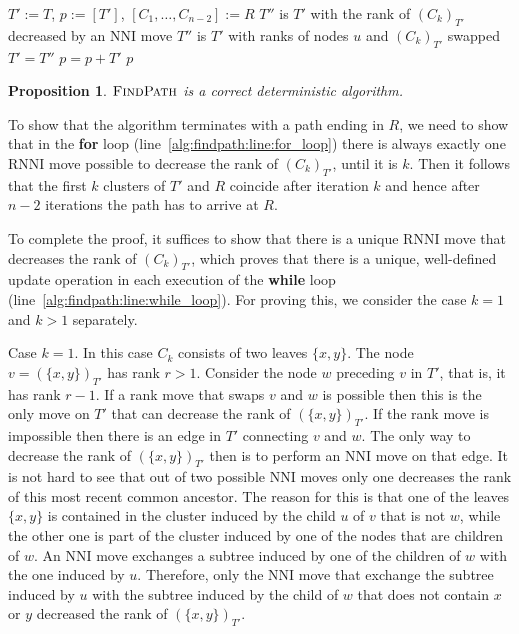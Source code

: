 \documentclass[11pt]{amsart}
\newtheorem{proposition}{Proposition}
\newcommand{\rnni}{\mathrm{RNNI}}
\newcommand{\findpath}{\textsc{FindPath}}
\newcommand{\rank}{\mathrm{rank}}
\newcommand{\nni}{\mathrm{NNI}}
\begin{document}
\begin{algorithm}[H]
\caption{$\findpath$($T,R$)}
\begin{algorithmic}[1]
\STATE $T' := T$, $p := [T']$, $[C_1, \ldots, C_{n-2}] := R$
\label{alg:findpath:line:for_loop}
	\WHILE {$\rank((C_k)_{T'})>k$}
	\label{alg:findpath:line:while_loop}
			\STATE $T''$ is $T'$ with the rank of $(C_k)_{T'}$ decreased by an $\nni$ move
		\ELSE
			\STATE $T''$ is $T'$ with ranks of nodes $u$ and $(C_k)_{T'}$ swapped
		\ENDIF
		\STATE $T' = T''$
		\STATE $p = p+T'$
	\ENDWHILE
\ENDFOR
\RETURN $p$
\end{algorithmic}
\end{algorithm}

\begin{proposition}
$\findpath$ is a correct deterministic algorithm.
\end{proposition}

\proof
To show that the algorithm terminates with a path ending in $R$, we need to show that in the \textbf{for} loop (line~\ref{alg:findpath:line:for_loop}) there is always exactly one $\rnni$ move possible to decrease the rank of $(C_k)_{T'}$, until it is $k$.
Then it follows that the first $k$ clusters of $T'$ and $R$ coincide after iteration $k$ and hence after $n-2$ iterations the path has to arrive at $R$.

To complete the proof, it suffices to show that there is a unique $\rnni$ move that decreases the rank of $(C_k)_{T'}$, which proves that there is a unique, well-defined update operation in each execution of the \textbf{while} loop (line~\ref{alg:findpath:line:while_loop}).
For proving this, we consider the case $k = 1$ and $k>1$ separately.

Case $k = 1$.
In this case $C_k$ consists of two leaves $\{x, y\}$.
The node $v = (\{x, y\})_{T'}$ has rank $r > 1$.
Consider the node $w$ preceding $v$ in $T'$, that is, it has rank $r - 1$.
If a rank move that swaps $v$ and $w$ is possible then this is the only move on $T'$ that can decrease the rank of $(\{x, y\})_{T'}$.
If the rank move is impossible then there is an edge in $T'$ connecting $v$ and $w$.
The only way to decrease the rank of $(\{x, y\})_{T'}$ then is to perform an $\nni$ move on that edge.
It is not hard to see that out of two possible $\nni$ moves only one decreases the rank of this most recent common ancestor.
The reason for this is that one of the leaves $\{x,y\}$ is contained in the cluster induced by the child $u$ of $v$ that is not $w$, while the other one is part of the cluster induced by one of the nodes that are children of $w$.
An $\nni$ move exchanges a subtree induced by one of the children of $w$ with the one induced by $u$.
Therefore, only the $\nni$ move that exchange the subtree induced by $u$ with the subtree induced by the child of $w$ that does not contain $x$ or $y$ decreased the rank of $(\{x, y\})_{T'}$.
\end{document}
